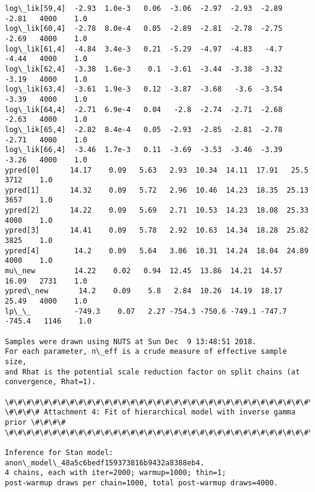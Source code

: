 \documentclass[11pt]{article}
\begin{document}
\begin{Verbatim}[commandchars=\\\{\}]
log\_lik[59,4]  -2.93  1.0e-3   0.06  -3.06  -2.97  -2.93  -2.89  -2.81   4000    1.0
log\_lik[60,4]  -2.78  8.0e-4   0.05  -2.89  -2.81  -2.78  -2.75  -2.69   4000    1.0
log\_lik[61,4]  -4.84  3.4e-3   0.21  -5.29  -4.97  -4.83   -4.7  -4.44   4000    1.0
log\_lik[62,4]  -3.38  1.6e-3    0.1  -3.61  -3.44  -3.38  -3.32  -3.19   4000    1.0
log\_lik[63,4]  -3.61  1.9e-3   0.12  -3.87  -3.68   -3.6  -3.54  -3.39   4000    1.0
log\_lik[64,4]  -2.71  6.9e-4   0.04   -2.8  -2.74  -2.71  -2.68  -2.63   4000    1.0
log\_lik[65,4]  -2.82  8.4e-4   0.05  -2.93  -2.85  -2.81  -2.78  -2.71   4000    1.0
log\_lik[66,4]  -3.46  1.7e-3   0.11  -3.69  -3.53  -3.46  -3.39  -3.26   4000    1.0
ypred[0]       14.17    0.09   5.63   2.93  10.34  14.11  17.91   25.5   3712    1.0
ypred[1]       14.32    0.09   5.72   2.96  10.46  14.23  18.35  25.13   3657    1.0
ypred[2]       14.22    0.09   5.69   2.71  10.53  14.23  18.08  25.33   4000    1.0
ypred[3]       14.41    0.09   5.78   2.92  10.63  14.34  18.28  25.82   3825    1.0
ypred[4]        14.2    0.09   5.64   3.06  10.31  14.24  18.04  24.89   4000    1.0
mu\_new         14.22    0.02   0.94  12.45  13.86  14.21  14.57  16.09   2731    1.0
ypred\_new       14.2    0.09    5.8   2.84  10.26  14.19  18.17  25.49   4000    1.0
lp\_\_          -749.3    0.07   2.27 -754.3 -750.6 -749.1 -747.7 -745.4   1146    1.0

Samples were drawn using NUTS at Sun Dec  9 13:48:51 2018.
For each parameter, n\_eff is a crude measure of effective sample size,
and Rhat is the potential scale reduction factor on split chains (at 
convergence, Rhat=1).

\#\#\#\#\#\#\#\#\#\#\#\#\#\#\#\#\#\#\#\#\#\#\#\#\#\#\#\#\#\#\#\#\#\#\#\#\#\#\#\#\#\#\#\#\#\#\#\#\#\#\#\#\#\#\#\#\#\#\#\#\#\#\#\#\#\#\#\#\#\#\#\#\#\#
\#\#\#\# Attachment 4: Fit of hierarchical model with inverse gamma prior \#\#\#\#
\#\#\#\#\#\#\#\#\#\#\#\#\#\#\#\#\#\#\#\#\#\#\#\#\#\#\#\#\#\#\#\#\#\#\#\#\#\#\#\#\#\#\#\#\#\#\#\#\#\#\#\#\#\#\#\#\#\#\#\#\#\#\#\#\#\#\#\#\#\#\#\#\#\#

Inference for Stan model: anon\_model\_48a5c6bedf159373816b9432a8388eb4.
4 chains, each with iter=2000; warmup=1000; thin=1; 
post-warmup draws per chain=1000, total post-warmup draws=4000.


\end{Verbatim}
\end{document}
